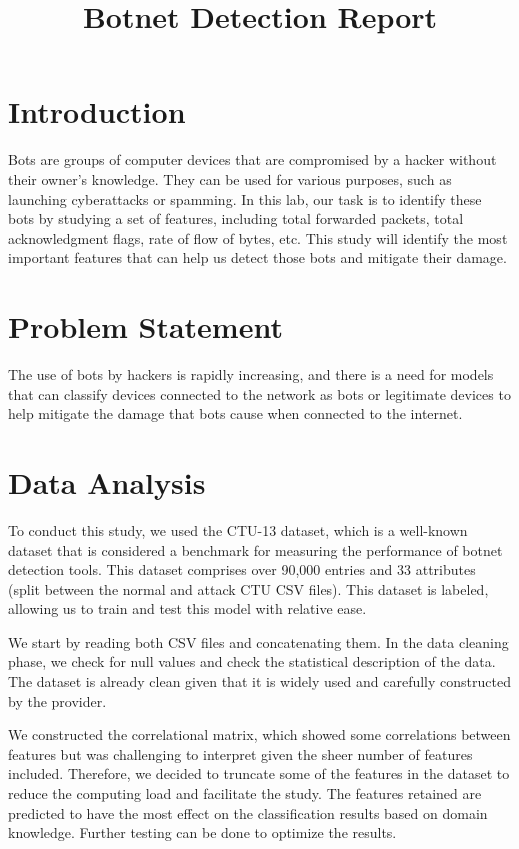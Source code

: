 \documentclass{article}
\title{Botnet Detection Report}
\author{}
\date{}
\begin{document}
\maketitle

\section{Introduction}
Bots are groups of computer devices that are compromised by a hacker without their owner's knowledge. They can be used for various purposes, such as launching cyberattacks or spamming. 
In this lab, our task is to identify these bots by studying a set of features, including total forwarded packets, total acknowledgment flags, rate of flow of bytes, etc.
This study will identify the most important features that can help us detect those bots and mitigate their damage.

\section{Problem Statement}
The use of bots by hackers is rapidly increasing, and there is a need for models that can classify devices connected to the network as bots or legitimate devices to help mitigate the damage that bots cause when connected to the internet.

\section{Data Analysis}
To conduct this study, we used the CTU-13 dataset, which is a well-known dataset that is considered a benchmark for measuring the performance of botnet detection tools. This dataset comprises over 90,000 entries and 33 attributes (split between the normal and attack CTU CSV files). This dataset is labeled, allowing us to train and test this model with relative ease.

We start by reading both CSV files and concatenating them. In the data cleaning phase, we check for null values and check the statistical description of the data. The dataset is already clean given that it is widely used and carefully constructed by the provider. 

We constructed the correlational matrix, which showed some correlations between features but was challenging to interpret given the sheer number of features included. Therefore, we decided to truncate some of the features in the dataset to reduce the computing load and facilitate the study. The features retained are predicted to have the most effect on the classification results based on domain knowledge. Further testing can be done to optimize the results.
\end{document}
